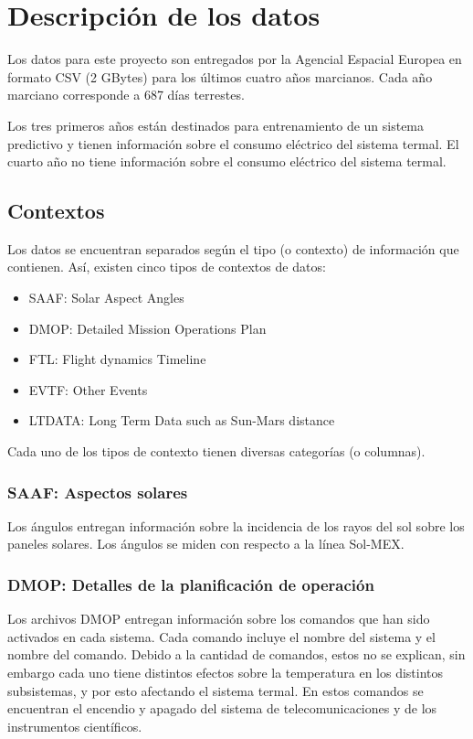 \documentclass[../Main.tex]{subfiles}
\begin{document}
\section{Descripción de los datos}

Los datos para este proyecto son entregados por la Agencial Espacial Europea en formato CSV (2 GBytes) para los últimos cuatro años marcianos. Cada año marciano corresponde a 687 días terrestes.
\newline \par
Los tres primeros años están destinados para entrenamiento de un sistema predictivo y tienen información sobre el consumo eléctrico del sistema termal. El cuarto año no tiene información sobre el consumo eléctrico del sistema termal.
\subsection*{Contextos}
Los datos se encuentran separados según el tipo (o contexto) de información que contienen. Así, existen cinco tipos de contextos de datos:
\begin{itemize}
    \item SAAF: Solar Aspect Angles
    \item DMOP: Detailed Mission Operations Plan
    \item FTL: Flight dynamics Timeline
    \item EVTF: Other Events
    \item LTDATA: Long Term Data such as Sun-Mars distance
\end{itemize}

Cada uno de los tipos de contexto tienen diversas categorías (o columnas).
\subsubsection*{SAAF: Aspectos solares}
Los ángulos entregan información sobre la incidencia de los rayos del sol sobre los paneles solares. Los ángulos se miden con respecto a la línea Sol-MEX.
\subsubsection*{DMOP: Detalles de la planificación de operación}
Los archivos DMOP entregan información sobre los comandos que han sido activados en cada sistema. Cada comando incluye el nombre del sistema y el nombre del comando. Debido a la cantidad de comandos, estos no se explican, sin embargo cada uno tiene distintos efectos sobre la temperatura en los distintos subsistemas, y por esto afectando el sistema termal. En estos comandos se encuentran el encendio y apagado del sistema de telecomunicaciones y de los instrumentos científicos.
\end{document}
